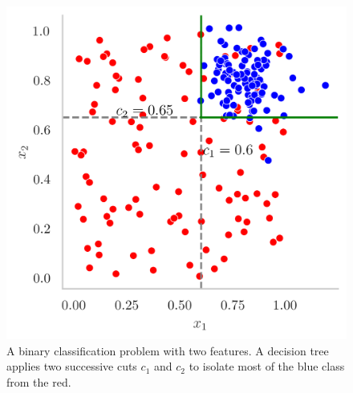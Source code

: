 \begin{figure}[h!]
    \center
    \begin{minipage}[c]{0.3\textwidth}
        \caption{A binary classification problem with two features. A decision tree applies two successive cuts $c_1$ and $c_2$ to isolate most of the blue class from the red.}\label{fig:tree-ex}
      \end{minipage}
      \begin{minipage}[c]{0.5\textwidth}
        \includegraphics[width=\textwidth]{Images/ML/scatterPlot.png}
      \end{minipage}
\end{figure}
    
